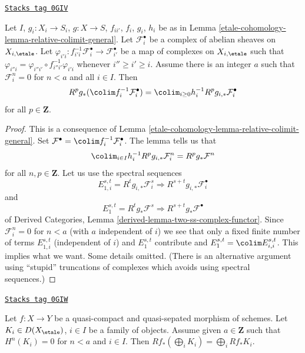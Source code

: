 \begin{lemma}
\label{etale-cohomology-lemma-relative-colimit-general-really-complexes}
\href{https://stacks.math.columbia.edu/tag/0GIV}{\texttt{Stacks tag 0GIV}}

Let $I$, $g_i : X_i \to S_i$, $g : X \to S$, $f_{ii'}$, $f_i$, $g_i$, $h_i$
be as in Lemma \ref{etale-cohomology-lemma-relative-colimit-general}.
Let $\mathcal{F}_i^\bullet$ be a complex of abelian sheaves on
$X_{i, \etale}$. Let $\varphi_{i'i} : f_{i'i}^{-1}\mathcal{F}_i^\bullet \to
\mathcal{F}_{i'}^\bullet$ be a map of complexes on $X_{i, \etale}$
such that $\varphi_{i''i} = \varphi_{i''i'} \circ f_{i'' i'}^{-1}\varphi_{i'i}$
whenever $i'' \geq i' \geq i$. Assume there is an integer $a$ such that
$\mathcal{F}_i^n = 0$ for $n < a$ and all $i \in I$. Then
$$
R^pg_*(\colim f_i^{-1}\mathcal{F}_i^\bullet) =
\colim_{i \geq 0} h_i^{-1}R^pg_{i, *}\mathcal{F}_i^\bullet
$$
for all $p \in \mathbf{Z}$.
\end{lemma}

\begin{proof}
This is a consequence of Lemma \ref{etale-cohomology-lemma-relative-colimit-general}. Set
$\mathcal{F}^\bullet = \colim f_i^{-1}\mathcal{F}_i^\bullet$.
The lemma tells us that
$$
\colim_{i \in I} h_i^{-1}R^pg_{i, *}\mathcal{F}_i^n = R^pg_*\mathcal{F}^n
$$
for all $n, p \in \mathbf{Z}$. Let us use the spectral sequences
$$
E_{1, i}^{s, t} = R^tg_{i, *}\mathcal{F}_i^s \Rightarrow
R^{s + t}g_{i, *}\mathcal{F}_i^\bullet
$$
and
$$
E_1^{s, t} = R^tg_*\mathcal{F}^s \Rightarrow
R^{s + t}g_*\mathcal{F}^\bullet
$$
of Derived Categories, Lemma \ref{derived-lemma-two-ss-complex-functor}.
Since $\mathcal{F}_i^n = 0$ for $n < a$ (with $a$ independent of $i$)
we see that only a fixed finite number of terms $E_{1, i}^{s, t}$
(independent of $i$) and $E_1^{s, t}$ contribute and
$E_1^{s, t} = \colim E_{i, i}^{s, t}$.
This implies what we want. Some details omitted.
(There is an alternative argument using ``stupid'' truncations
of complexes which avoids using spectral sequences.)
\end{proof}

\begin{lemma}
\label{etale-cohomology-lemma-direct-sum-bounded-below-pushforward}
\href{https://stacks.math.columbia.edu/tag/0GIW}{\texttt{Stacks tag 0GIW}}

Let $f : X \to Y$ be a quasi-compact and quasi-sepated morphism of
schemes. Let $K_i \in D(X_\etale)$, $i \in I$ be a family of objects.
Assume given $a \in \mathbf{Z}$ such that $H^n(K_i) = 0$ for $n < a$
and $i \in I$. Then $Rf_*(\bigoplus_i K_i) = \bigoplus_i Rf_*K_i$.
\end{lemma}

